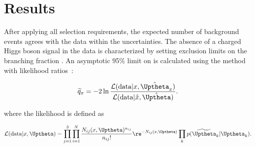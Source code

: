 \section{Results}
\label{s:secResults}
After applying all selection requirements, the expected number of 
background events agrees with the data within the uncertainties. 
The absence of a charged Higgs boson signal in the 
data is characterized by setting exclusion limits on the branching 
fraction \Bthb. 
An asymptotic 95\% \CL limit on \Bthb is 
calculated using the \CLs method~\cite{Junk:1999kv,Read:2002hq} with
likelihood ratios~\cite{Cowan:2010js}:
\begin{linenomath}
\begin{equation}
    \widetilde{q}_{x} = -2 \ln \frac{\mathcal{L}(\text{data}|x,
    \hat{\Uptheta}_{x})}{\mathcal{L}(\text{data}|\hat{x},\hat{\Uptheta})}.
\end{equation}  
\end{linenomath}
where the likelihood is defined as 
\begin{linenomath}
\begin{equation}
    \mathcal{L}(\text{data}|x,\Uptheta) = \prod_{j=1}^{3}\prod_{i=1}^{N}\frac{N_{ij}(x, 
    \Uptheta)^{n_{ij}}}{n_{ij}!}\re^{-N_{ij}(x, \Uptheta)} \prod_k
    p(\widetilde{\Uptheta}_k|\Uptheta_k).
\label{eq:likelihood}
\end{equation}
\end{linenomath}

